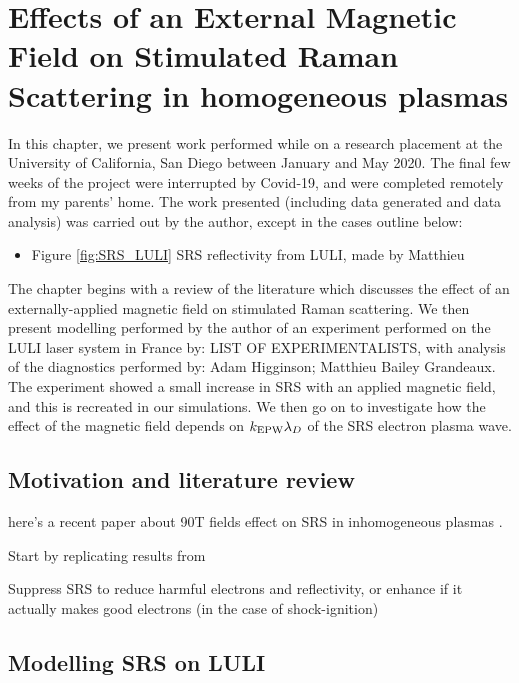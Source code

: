 \chapter{Effects of an External Magnetic Field on Stimulated Raman Scattering in homogeneous plasmas}
\label{chp:magSRS}

In this chapter, we present work performed while on a research placement at the University of California, San Diego between January and May 2020. The final few weeks of the project were interrupted by Covid-19, and were completed remotely from my parents' home. The work presented (including data generated and data analysis) was carried out by the author, except in the cases outline below:
\begin{itemize}
\item Figure \ref{fig:SRS_LULI} SRS reflectivity from LULI, made by Matthieu
\end{itemize}

The chapter begins with a review of the literature which discusses the effect of an externally-applied magnetic field on stimulated Raman scattering. We then present modelling performed by the author of an experiment performed on the LULI laser system in France by: LIST OF EXPERIMENTALISTS, with analysis of the diagnostics performed by: Adam Higginson; Matthieu Bailey Grandeaux. The experiment showed a small increase in SRS with an applied magnetic field, and this is recreated in our simulations. We then go on to investigate how the effect of the magnetic field depends on $k_\mathrm{EPW}\lambda_D$ of the SRS electron plasma wave.

\section{Motivation and literature review}

here's a recent paper about 90T fields effect on SRS in inhomogeneous plasmas \citep{Zhou2021}. 

Start by replicating results from \cite{Winjum2018}

Suppress SRS to reduce harmful electrons and reflectivity, or enhance if it actually makes good electrons (in the case of shock-ignition)

\section{Modelling SRS on LULI}
